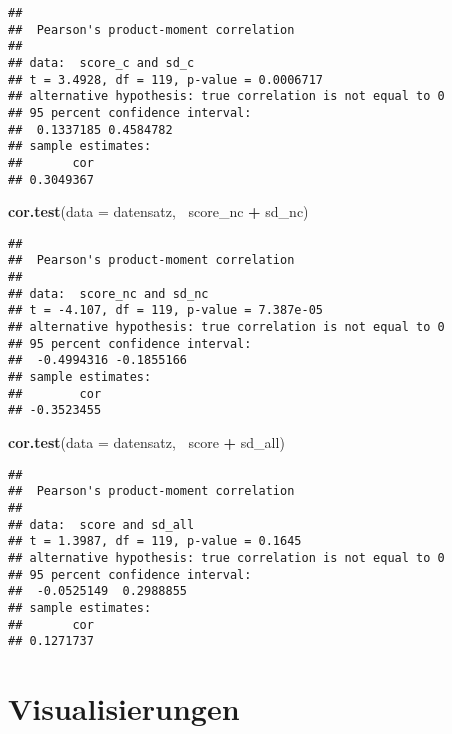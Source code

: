 \documentclass[]{article}
\newenvironment{Shaded}{\begin{snugshade}}{\end{snugshade}}
\newcommand{\KeywordTok}[1]{\textcolor[rgb]{0.13,0.29,0.53}{\textbf{#1}}}
\newcommand{\DataTypeTok}[1]{\textcolor[rgb]{0.13,0.29,0.53}{#1}}
\newcommand{\StringTok}[1]{\textcolor[rgb]{0.31,0.60,0.02}{#1}}
\newcommand{\OperatorTok}[1]{\textcolor[rgb]{0.81,0.36,0.00}{\textbf{#1}}}
\newcommand{\NormalTok}[1]{#1}
\begin{document}
\begin{verbatim}
## 
##  Pearson's product-moment correlation
## 
## data:  score_c and sd_c
## t = 3.4928, df = 119, p-value = 0.0006717
## alternative hypothesis: true correlation is not equal to 0
## 95 percent confidence interval:
##  0.1337185 0.4584782
## sample estimates:
##       cor 
## 0.3049367
\end{verbatim}

\begin{Shaded}
\begin{Highlighting}[]
\KeywordTok{cor.test}\NormalTok{(}\DataTypeTok{data =}\NormalTok{ datensatz, }\OperatorTok{~}\NormalTok{score_nc }\OperatorTok{+}\StringTok{ }\NormalTok{sd_nc)}
\end{Highlighting}
\end{Shaded}

\begin{verbatim}
## 
##  Pearson's product-moment correlation
## 
## data:  score_nc and sd_nc
## t = -4.107, df = 119, p-value = 7.387e-05
## alternative hypothesis: true correlation is not equal to 0
## 95 percent confidence interval:
##  -0.4994316 -0.1855166
## sample estimates:
##        cor 
## -0.3523455
\end{verbatim}

\begin{Shaded}
\begin{Highlighting}[]
\KeywordTok{cor.test}\NormalTok{(}\DataTypeTok{data =}\NormalTok{ datensatz, }\OperatorTok{~}\NormalTok{score }\OperatorTok{+}\StringTok{ }\NormalTok{sd_all)}
\end{Highlighting}
\end{Shaded}

\begin{verbatim}
## 
##  Pearson's product-moment correlation
## 
## data:  score and sd_all
## t = 1.3987, df = 119, p-value = 0.1645
## alternative hypothesis: true correlation is not equal to 0
## 95 percent confidence interval:
##  -0.0525149  0.2988855
## sample estimates:
##       cor 
## 0.1271737
\end{verbatim}

\section{Visualisierungen}\label{visualisierungen}
\end{document}
